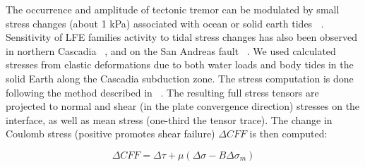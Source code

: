 \documentclass[draft]{agujournal2019}
\begin{document}
The occurrence and amplitude of tectonic tremor can be modulated by small stress changes (about 1 kPa) associated with ocean or solid earth tides \textbf{~\cite{SHE_2007_G3,HOU_2011,HOU_2015}}. Sensitivity of LFE families activity to tidal stress changes has also been observed in northern Cascadia ~\cite{ROY_2015}, and on the San Andreas fault ~\cite{THO_2012}. We used calculated stresses from elastic deformations due to both water loads and body tides in the solid Earth along the Cascadia subduction zone. The stress computation is done following the method described in ~. The resulting full stress tensors are projected to normal and shear (in the plate convergence direction) stresses on the interface, as well as mean stress (one-third the tensor trace). The change in Coulomb stress (positive promotes shear failure) $\Delta CFF$ is then computed:

\begin{linenomath*}
\begin{equation}
\Delta CFF = \Delta \tau + \mu \left( \Delta \sigma - B \Delta \sigma_m \right)
\end{equation}
\end{linenomath*}
\end{document}
